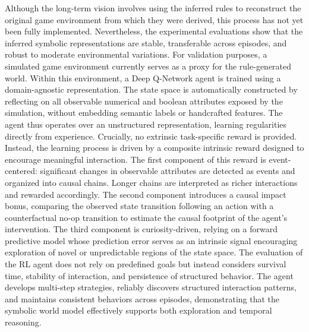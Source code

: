 \documentclass[12pt,a4paper]{report}
\begin{document}
Although the long-term vision involves using the inferred rules to reconstruct the original game environment from which they were derived, this process has not yet been fully implemented. 
Nevertheless, the experimental evaluations show that the inferred symbolic representations are stable, transferable across episodes, and robust to moderate environmental variations. For validation purposes, a simulated game environment currently serves as a proxy for the rule-generated world.
Within this environment, a Deep Q-Network agent is trained using a domain-agnostic representation. The state space is automatically constructed by reflecting on all observable numerical and boolean attributes exposed by the simulation, without embedding semantic labels or handcrafted features. 
The agent thus operates over an unstructured representation, learning regularities directly from experience. Crucially, no extrinsic task-specific reward is provided. Instead, the learning process is driven by a composite intrinsic reward designed to encourage meaningful interaction.
The first component of this reward is event-centered: significant changes in observable attributes are detected as events and organized into causal chains. Longer chains are interpreted as richer interactions and rewarded accordingly. The second component introduces a causal impact bonus, comparing the observed state transition following an action with a counterfactual no-op transition to estimate the causal footprint of the agent's intervention. The third component is curiosity-driven, relying on a forward predictive model whose prediction error serves as an intrinsic signal encouraging exploration of novel or unpredictable regions of the state space.
The evaluation of the RL agent does not rely on predefined goals but instead considers survival time, stability of interaction, and persistence of structured behavior. The agent  develops multi-step strategies, reliably discovers structured interaction patterns, and maintains  consistent behaviors across episodes, demonstrating that the symbolic world model effectively  supports both exploration and temporal reasoning.
\end{document}
